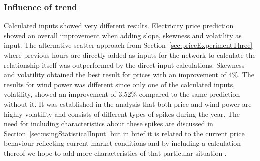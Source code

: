 \subsubsection{Influence of trend}
Calculated inputs showed very different results. Electricity price prediction showed an overall improvement when adding slope, skewness and volatility as input. The alternative scatter approach from Section~\ref{sec:priceExperimentThree} where previous hours are directly added as inputs for the network to calculate the relationship itself was outperformed by the direct input calculations. Skewness and volatility obtained the best result for prices with an improvement of 4\%. The results for wind power was different since only one of the calculated inputs, volatility, showed an improvement of 3,52\% compared to the same prediction without it. It was established in the analysis that both price and wind power are highly volatility and consists of different types of spikes during the year. The need for including characteristics about these spikes are discussed in Section~\ref{sec:usingStatisticalInput} but in brief it is related to the current price behaviour reflecting current market conditions\cite{yamin2004adaptive} and by including a calculation thereof we hope to add more characteristics of that particular situation . 


